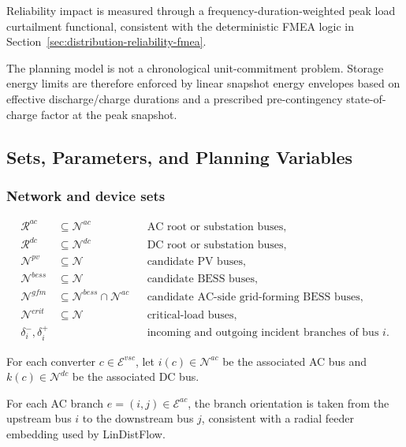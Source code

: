 \begin{assumption}
Reliability impact is measured through a frequency-duration-weighted peak load curtailment functional, consistent with the deterministic FMEA logic in Section~\ref{sec:distribution-reliability-fmea}.
\end{assumption}

\begin{assumption}
The planning model is not a chronological unit-commitment problem. Storage energy limits are therefore enforced by linear snapshot energy envelopes based on effective discharge/charge durations and a prescribed pre-contingency state-of-charge factor at the peak snapshot.
\end{assumption}

\subsection{Sets, Parameters, and Planning Variables}

\subsubsection{Network and device sets}

\begin{align}
\mathcal{R}^{ac} &\subseteq \mathcal{N}^{ac} && \text{AC root or substation buses}, \\
\mathcal{R}^{dc} &\subseteq \mathcal{N}^{dc} && \text{DC root or substation buses}, \\
\mathcal{N}^{pv} &\subseteq \mathcal{N} && \text{candidate PV buses}, \\
\mathcal{N}^{bess} &\subseteq \mathcal{N} && \text{candidate BESS buses}, \\
\mathcal{N}^{gfm} &\subseteq \mathcal{N}^{bess}\cap\mathcal{N}^{ac} && \text{candidate AC-side grid-forming BESS buses}, \\
\mathcal{N}^{crit} &\subseteq \mathcal{N} && \text{critical-load buses}, \\
\delta_i^{-},\delta_i^{+} &&& \text{incoming and outgoing incident branches of bus } i.
\end{align}

For each converter \(c\in\mathcal{E}^{vsc}\), let \(i(c)\in\mathcal{N}^{ac}\) be the associated AC bus and \(k(c)\in\mathcal{N}^{dc}\) be the associated DC bus.

For each AC branch \(e=(i,j)\in\mathcal{E}^{ac}\), the branch orientation is taken from the upstream bus \(i\) to the downstream bus \(j\), consistent with a radial feeder embedding used by LinDistFlow.

